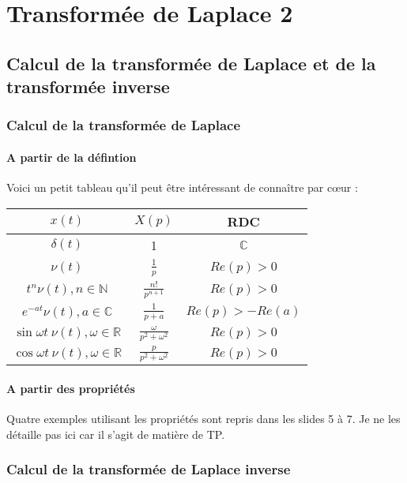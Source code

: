 \chapter{Transformée de Laplace 2}
\section{Calcul de la transformée de Laplace et de la transformée inverse}
	
	\subsection{Calcul de la transformée de Laplace}
		\subsubsection{A partir de la défintion}
		Voici un petit tableau qu'il peut être intéressant de connaître par cœur :
		\begin{center}
		\begin{tabular}{|c|c|c|}
		\hline 
		$x(t)$ & $X(p)$ & RDC \\ 
		\hline 
		$\delta(t)$ & 1 & $\mathbb{C}$ \\ 
		\hline 
		$\nu(t)$ & $\frac{1}{p}$ & $Re(p)>0$ \\ 
		\hline 
		$t^n\nu(t), n \in \mathbb{N}$ & $\frac{n!}{p^{n+1}}$ & $Re(p)>0$ \\ 
		\hline 
		$e^{-at}\nu(t), a \in \mathbb{C}$ & $\frac{1}{p+a}$ & $Re(p)>-Re(a)$ \\ 
		\hline 
		$\sin\omega t\ \nu(t), \omega \in \mathbb{R}$ & $\frac{\omega}{p^2+\omega^2}$ &
		 $Re(p)>0$ \\ 
		\hline $\cos\omega t\ \nu(t), \omega \in \mathbb{R}$ & $\frac{p}{p^2+\omega^2}$ &
		 $Re(p)>0$ \\ 
		\hline 
		\end{tabular} 
		\end{center}
		
		\subsubsection{A partir des propriétés}
		Quatre exemples utilisant les propriétés sont repris dans les slides 5 à 7. Je ne 
		les détaille pas ici car il s'agit de matière de TP.

	\subsection{Calcul de la transformée de Laplace inverse}
		
